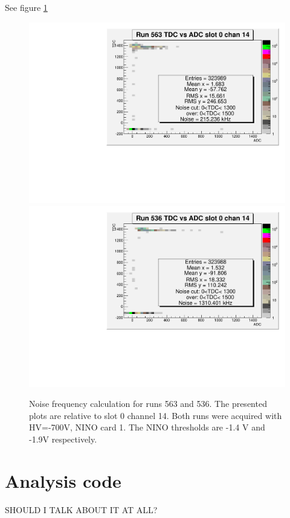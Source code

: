 \documentclass{article}
\begin{document}
See figure \ref{fig:noise}

\begin{figure}[htbp]
\includegraphics[width=\textwidth]{run_563_tdc_vs_adc_chan_14}
\includegraphics[width=\textwidth]{run_536_tdc_vs_adc_chan_14}
\caption{Noise frequency calculation for runs 563 and 536. The presented plots are relative to slot 0 channel 14. Both runs were acquired with HV=-700V, NINO card 1. The NINO thresholds are -1.4 V and -1.9V respectively.}
\label{fig:noise}
\end{figure}

\section{Analysis code}\label{sec:code}
SHOULD I TALK ABOUT IT AT ALL?
\end{document}
